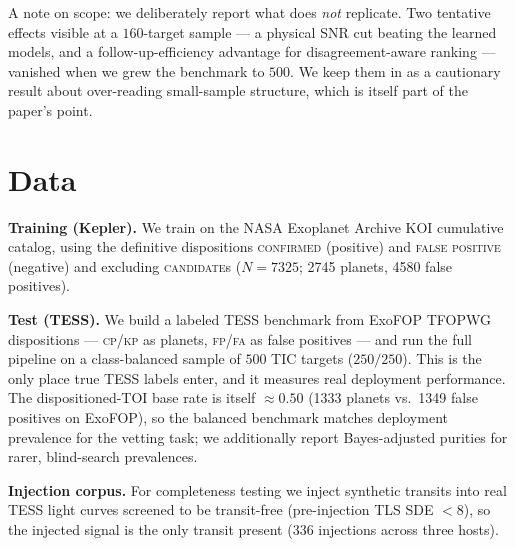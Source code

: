 \documentclass[11pt]{article}
\begin{document}
A note on scope: we deliberately report what does \emph{not} replicate. Two
tentative effects visible at a $160$-target sample --- a physical SNR cut beating
the learned models, and a follow-up-efficiency advantage for disagreement-aware
ranking --- vanished when we grew the benchmark to $500$. We keep them in as a
cautionary result about over-reading small-sample structure, which is itself part
of the paper's point.

\section{Data}
\textbf{Training (Kepler).} We train on the NASA Exoplanet Archive KOI cumulative
catalog, using the definitive dispositions \textsc{confirmed} (positive) and
\textsc{false positive} (negative) and excluding \textsc{candidate}s
($N=7325$; 2745 planets, 4580 false positives).

\textbf{Test (TESS).} We build a labeled TESS benchmark from ExoFOP TFOPWG
dispositions --- \textsc{cp}/\textsc{kp} as planets, \textsc{fp}/\textsc{fa} as
false positives --- and run the full pipeline on a class-balanced sample of $500$
TIC targets ($250/250$). This is the only place true TESS labels enter, and it
measures real deployment performance. The dispositioned-TOI base rate is itself
$\approx\!0.50$ (1333 planets vs.\ 1349 false positives on ExoFOP), so the balanced
benchmark matches deployment prevalence for the vetting task; we additionally
report Bayes-adjusted purities for rarer, blind-search prevalences.

\textbf{Injection corpus.} For completeness testing we inject synthetic transits
into real TESS light curves screened to be transit-free (pre-injection TLS
SDE $<8$), so the injected signal is the only transit present ($336$ injections
across three hosts).
\end{document}
